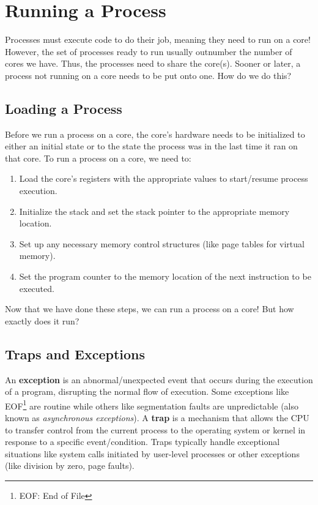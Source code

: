 \documentclass{report}
\newcommand{\definitionBegin}[1]{\begin{tcolorbox}[title={Definition: #1}]}
\newcommand{\definitionEnd}{\end{tcolorbox}}
\begin{document}
\section{Running a Process}
Processes must execute code to do their job, meaning they need to run on a core! However, the set of
processes ready to run usually outnumber the number of cores we have. Thus, the processes need to
share the core(s). Sooner or later, a process not running on a core needs to be put onto one. How do
we do this?

\subsection{Loading a Process}
Before we run a process on a core, the core's hardware needs to be initialized to either an initial state
or to the state the process was in the last time it ran on that core. To run a process on a core, we need to:
\begin{enumerate}[label=\textit{(\roman*)}]
\item Load the core's registers with the appropriate values to start/resume process execution.
\item Initialize the stack and set the stack pointer to the appropriate memory location.
\item Set up any necessary memory control structures (like page tables for virtual memory).
\item Set the program counter to the memory location of the next instruction to be executed.
\end{enumerate}
Now that we have done these steps, we can run a process on a core! But how exactly does it run?


\subsection{Traps and Exceptions}
\definitionBegin{Trap and Exception}
An \textbf{exception} is an abnormal/unexpected event that occurs during the execution of a program,
disrupting the normal flow of execution. Some exceptions like EOF\footnote{EOF: End of File} are
routine while others like segmentation faults are unpredictable (also known as \textit{asynchronous
  exceptions}). 
\tcblower
A \textbf{trap} is a mechanism that allows the CPU to transfer control from the current process to
the operating system or kernel in response to a specific event/condition. Traps typically handle
exceptional situations like system calls initiated by user-level processes or other exceptions (like
division by zero, page faults).
\definitionEnd
\end{document}
